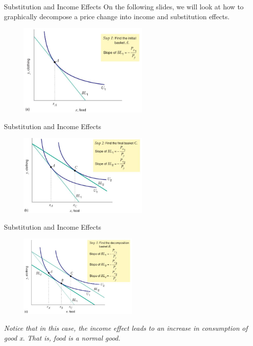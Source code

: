 \documentclass[11pt,t]{beamer}
\begin{document}
\begin{frame}{Substitution and Income Effects}
  On the following slides, we will look at how to graphically decompose a price change into income and substitution effects.
  \begin{figure}
    \includegraphics[width=240px]{figures/fig5_6a.jpg}
  \end{figure}
\end{frame}

\begin{frame}{Substitution and Income Effects}
  \begin{figure}
    \includegraphics[width=240px]{figures/fig5_6b.jpg}
  \end{figure}
\end{frame}

\begin{frame}{Substitution and Income Effects}
  \begin{figure}
    \includegraphics[width=220px]{figures/fig5_6c.jpg}
  \end{figure}

  \emph{Notice that in this case, the income effect leads to an increase in consumption of good x. That is, food is a normal good.}
\end{frame}
\end{document}
